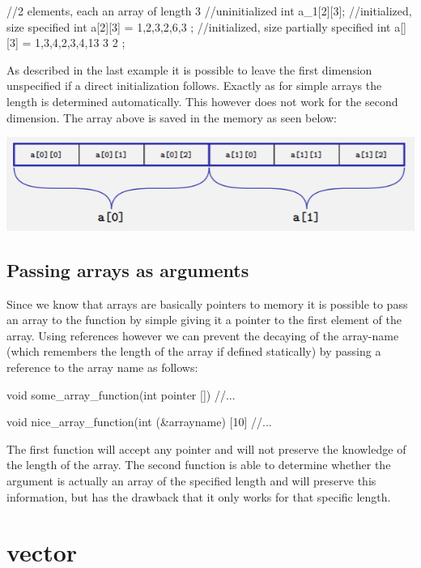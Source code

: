 \documentclass[10pt,a4paper]{scrartcl}
\begin{document}
\begin{multicols*}{2}
\begin{TPCpp}
//2 elements, each an array of length 3
//uninitialized
int a_1[2][3];
//initialized, size specified
int a[2][3] = {
	{1,2,3},{2,6,3}
};
//initialized, size partially specified
int a[][3] = {
	{1,3,4},{2,3,4},{13 3 2}
};
\end{TPCpp}

As described in the last example it is possible to leave the first dimension unspecified if a direct initialization follows. Exactly as for simple arrays the length is determined automatically. This however does not work for the second dimension.
The array above is saved in the memory as seen below:

\includegraphics[width=\linewidth]{Pictures/2DArray}

\subsection{Passing arrays as arguments}

Since we know that arrays are basically pointers to memory it is possible to pass an array to the function by simple giving it a pointer to the first element of the array. Using references however we can prevent the decaying of the array-name (which remembers the length of the array if defined statically) by passing a reference to the array name as follows:

\begin{TPCpp}
void some_array_function(int pointer []){
	//...
}

void nice_array_function(int (&arrayname) [10]{
	//...
}
\end{TPCpp}

The first function will accept any pointer and will not preserve the knowledge of the length of the array. The second function is able to determine whether the argument is actually an array of the specified length and will preserve this information, but has the drawback that it only works for that specific length.

\section{vector}


\end{multicols*}
\end{document}
